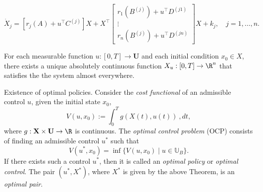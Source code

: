 %
%
%
%
\begin{frame}{}
    \begin{equation*}
        \dot{X}_j  =  [r_j(A) + u^\top C^{(j)}]X +
        X^\top    \begin{bmatrix}
        r_1(B^{(j)}) + u^\top D^{(j1)}\\
        \vdots \\
        r_n(B^{(j)}) + u^\top D^{(jn)}
      \end{bmatrix}  X + k_j, \quad j=1,\dots, n.
    \end{equation*}
%
    \begin{theorem}
        For each measurable function 
        $u:[0,T]\to \mathbf{U}$ and each initial condition $x_0\in X$,
        there exists a unique absolutely continuous function 
        $X_u:[0,T]\to \R^n$ that satisfies the the 
        system  almost everywhere. 
    \end{theorem}
\end{frame}
%
%
%
\begin{frame}{Existence of optimal policies.}
    Consider the  {\it cost functional} of an admissible control $u$, given the 
    initial state $x_0$, 
    \begin{equation}\label{CostFunctional} 
        V(u,x_0) := \int_0 ^ T g(X(t), u(t)) \ ,dt,
    \end{equation}
    where $g: \mathbf{X} \times \mathbf{U} \to \R$ is continuous. 
    The {\it optimal control problem} (OCP) consists of finding an admissible 
    control $u^\ast$ such that
    \[ V(u^\ast,x_0)=\inf\{ V(u,x_0)\mid u\in \mathbb{U}_B \}.\]
    If there exists such a control $u^\ast$, then it is called an 
    {\it optimal policy} or {\it optimal control}. 
    The pair $(u^\ast,X^\ast)$, where $X^\ast$ is given by 
    the above Theorem, is an {\it optimal pair}.
\end{frame}
